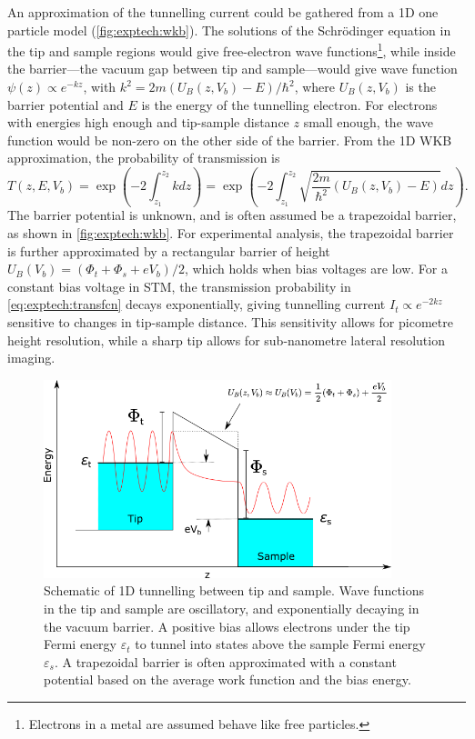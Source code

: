 \sloppy An approximation of the tunnelling current could be gathered from a \ac{1D} one particle model (\autoref{fig:exptech:wkb}). The solutions of the Schr\"odinger equation in the tip and sample regions would give free-electron wave functions\footnote{Electrons in a metal are assumed behave like free particles.}, while inside the barrier---the vacuum gap between tip and sample---would give wave function $\psi(z) \propto e^{-kz}$, with $k^2 = 2m({U_B(z,V_b) - E})/\hbar^2$, where $U_B(z,V_b)$ is the barrier potential and $E$ is the energy of the tunnelling electron. For electrons with energies high enough and tip-sample distance $z$ small enough, the wave function would be non-zero on the other side of the barrier. From the \ac{1D} \ac{WKB} approximation, the probability of transmission is
\begin{equation} \label{eq:exptech:transfcn}
T(z,E,V_b) = \exp{\left(-2\int_{z_1} ^{z_2} k dz \right)} = \exp{\left(-2  \int_{z_1}^{z_2} \sqrt{\frac{2m}{\hbar^2}\left(U_B(z,V_b) - E\right)} dz \right)}.
\end{equation}
 The barrier potential is unknown, and is often assumed be a trapezoidal barrier, as shown in \autoref{fig:exptech:wkb}. For experimental analysis, the trapezoidal barrier is further approximated by a rectangular barrier of height $U_B(V_b) = (\Phi_t + \Phi_s + eV_b)/2$, which holds when bias voltages are low. For a constant bias voltage in \ac{STM}, the transmission probability in \autoref{eq:exptech:transfcn} decays exponentially, giving tunnelling current $I_t \propto e^{-2kz}$ sensitive to changes in tip-sample distance. This sensitivity allows for picometre height resolution, while a sharp tip allows for sub-nanometre lateral resolution imaging.


\begin{figure} [t]
    \centering
    \includegraphics[width=0.9\textwidth]{pictures/wkb.png}
    \caption{Schematic of 1D tunnelling between tip and sample. Wave functions in the tip and sample are oscillatory, and exponentially decaying in the vacuum barrier. A positive bias allows electrons under the tip Fermi energy $\varepsilon_t$ to tunnel into states above the sample Fermi energy $\varepsilon_s$.
    A trapezoidal barrier is often approximated with a constant potential based on the average work function and the bias energy.}
    \label{fig:exptech:wkb}
\end{figure}

